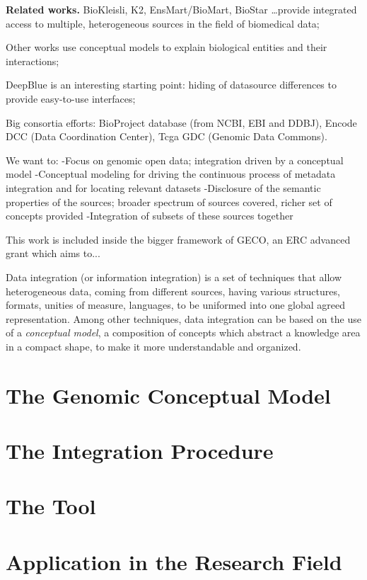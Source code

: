 \documentclass[conference]{IEEEtran}
\begin{document}
\textbf{Related works.}
BioKleisli, K2, EnsMart/BioMart, BioStar \ldots provide integrated access to multiple, heterogeneous sources in the field of biomedical data;

Other works use conceptual models to explain biological entities and their interactions;

DeepBlue is an interesting starting point:  hiding of datasource differences to provide easy-to-use interfaces;

Big consortia efforts: BioProject database (from NCBI, EBI and DDBJ), Encode DCC (Data Coordination Center), Tcga GDC (Genomic Data Commons).

We want to:
-Focus on genomic open data; integration driven by a conceptual model
-Conceptual modeling for driving the continuous process of metadata integration and for locating relevant datasets
-Disclosure of the semantic properties of the sources; broader spectrum of sources covered, richer set of concepts provided
-Integration of subsets of these sources together

This work is included inside the bigger framework of GECO, an ERC advanced grant which aims to...

Data integration (or information integration) is a set of techniques that allow heterogeneous data, coming from different sources, having various structures, formats, unities of measure, languages, to be uniformed into one global agreed representation.
Among other techniques, data integration can be based on the use of a \textit{conceptual model}, a composition of concepts which abstract a knowledge area in a compact shape, to make it more understandable and organized.



\section{The Genomic Conceptual Model}



\section{The Integration Procedure}

\section{The Tool}

\section{Application in the Research Field}
\end{document}
